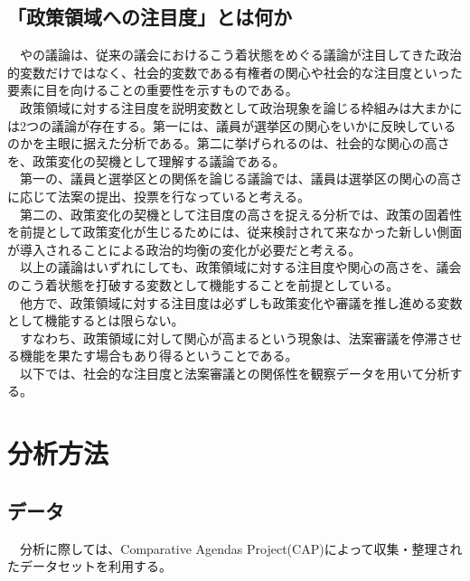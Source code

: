\documentclass[here]{article}
\begin{document}
\subsection{「政策領域への注目度」とは何か}
　\citet*{Binder2003-bn}や\citet*{Adler2013-ay}の議論は、従来の議会におけるこう着状態をめぐる議論が注目してきた政治的変数だけではなく、社会的変数である有権者の関心や社会的な注目度といった要素に目を向けることの重要性を示すものである。\\
　政策領域に対する注目度を説明変数として政治現象を論じる枠組みは大まかには2つの議論が存在する。第一には、議員が選挙区の関心をいかに反映しているのかを主眼に据えた分析である。第二に挙げられるのは、社会的な関心の高さを、政策変化の契機として理解する議論である。\\
　第一の、議員と選挙区との関係を論じる議論では、議員は選挙区の関心の高さに応じて法案の提出、投票を行なっていると考える。\\
　第二の、政策変化の契機として注目度の高さを捉える分析では、政策の固着性を前提として政策変化が生じるためには、従来検討されて来なかった新しい側面が導入されることによる政治的均衡の変化が必要だと考える。\citep*{Baumgartner1993-bc}\\
　以上の議論はいずれにしても、政策領域に対する注目度や関心の高さを、議会のこう着状態を打破する変数として機能することを前提としている。\\
　他方で、政策領域に対する注目度は必ずしも政策変化や審議を推し進める変数として機能するとは限らない。\\
　すなわち、政策領域に対して関心が高まるという現象は、法案審議を停滞させる機能を果たす場合もあり得るということである。\\
　以下では、社会的な注目度と法案審議との関係性を観察データを用いて分析する。\\

\section{分析方法}
\subsection{データ}
　分析に際しては、Comparative Agendas Project(CAP)によって収集・整理されたデータセットを利用する。\\
\end{document}
